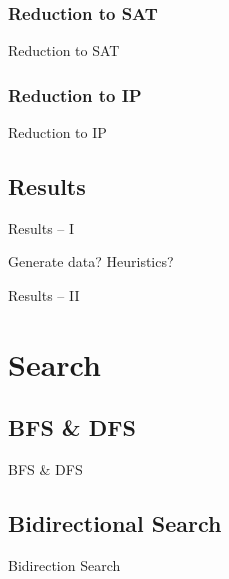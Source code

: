 \documentclass[t,10pt,
mathserif,xcolor=dvipsnames]{beamer}
\begin{document}
\subsubsection{Reduction to SAT}

\begin{myframe}{Reduction to SAT}

\end{myframe}

\subsubsection{Reduction to IP}

\begin{myframe}{Reduction to IP}

\end{myframe}

\subsection{Results}

\begin{myframe}{Results -- I}

  Generate data?
  Heuristics?
  
\end{myframe}

\begin{myframe}{Results -- II}

\end{myframe}


\section{Search}


\subsection{BFS \& DFS}

\begin{myframe}{BFS \& DFS}

\end{myframe}

\subsection{Bidirectional Search}

\begin{myframe}{Bidirection Search}

\end{myframe}
\end{document}
